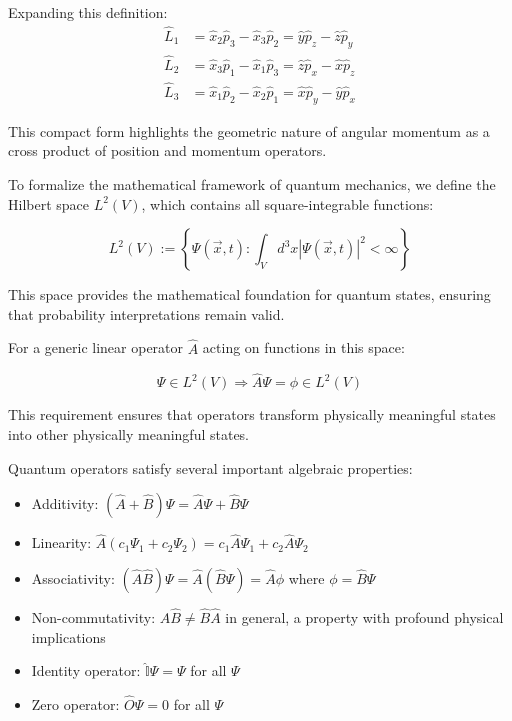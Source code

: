 \documentclass[italian]{HKNdocument}
\begin{document}
Expanding this definition:
\begin{align}
\hat{L}_1 &= \hat{x}_2\hat{p}_3 - \hat{x}_3\hat{p}_2 = \hat{y}\hat{p}_z - \hat{z}\hat{p}_y \\
\hat{L}_2 &= \hat{x}_3\hat{p}_1 - \hat{x}_1\hat{p}_3 = \hat{z}\hat{p}_x - \hat{x}\hat{p}_z \\
\hat{L}_3 &= \hat{x}_1\hat{p}_2 - \hat{x}_2\hat{p}_1 = \hat{x}\hat{p}_y - \hat{y}\hat{p}_x
\end{align}

This compact form highlights the geometric nature of angular momentum as a cross product of position and momentum operators.

To formalize the mathematical framework of quantum mechanics, we define the Hilbert space $L^{2}(V)$, which contains all square-integrable functions:

\begin{equation}
L^{2}(V) := \left\{\Psi(\vec{x},t) : \int_{V} d^{3}x |\Psi(\vec{x},t)|^{2} < \infty \right\} \label{eq:1.50}
\end{equation}

This space provides the mathematical foundation for quantum states, ensuring that probability interpretations remain valid.

For a generic linear operator $\hat{A}$ acting on functions in this space:

\begin{equation}
\Psi \in L^{2}(V) \Rightarrow \hat{A}\Psi = \phi \in L^{2}(V)
\end{equation}

This requirement ensures that operators transform physically meaningful states into other physically meaningful states.

Quantum operators satisfy several important algebraic properties:

\begin{itemize}
  \item Additivity: $(\hat{A}+\hat{B})\Psi = \hat{A}\Psi + \hat{B}\Psi$
  \item Linearity: $\hat{A}(c_{1}\Psi_{1} + c_{2}\Psi_{2}) = c_{1}\hat{A}\Psi_{1} + c_{2}\hat{A}\Psi_{2}$
  \item Associativity: $(\hat{A}\hat{B})\Psi = \hat{A}(\hat{B}\Psi) = \hat{A}\phi$ where $\phi = \hat{B}\Psi$
  \item Non-commutativity: $\hat{A}\hat{B} \neq \hat{B}\hat{A}$ in general, a property with profound physical implications
  \item Identity operator: $\hat{\mathbb{I}}\Psi = \Psi$ for all $\Psi$
  \item Zero operator: $\hat{O}\Psi = 0$ for all $\Psi$
\end{itemize}
\end{document}

